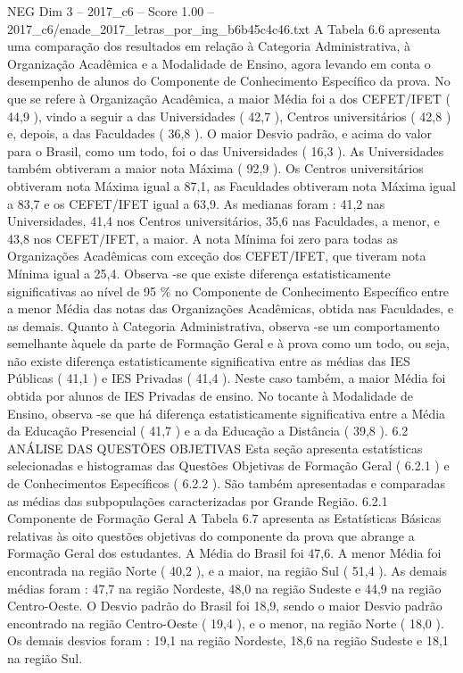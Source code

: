 \begin{textsample}{NEG Dim 3 – 2017\_c6 – Score 1.00 – 2017\_c6/enade\_2017\_letras\_por\_ing\_b6b45c4c46.txt}
A Tabela 6.6 apresenta uma comparação dos resultados em relação à Categoria Administrativa, à Organização Acadêmica e a Modalidade de Ensino, agora levando em conta o desempenho de alunos do Componente de Conhecimento Específico da prova.
No que se refere à Organização Acadêmica, a maior Média foi a dos CEFET/IFET ( 44,9 ), vindo a seguir a das Universidades ( 42,7 ), Centros universitários ( 42,8 ) e, depois, a das Faculdades ( 36,8 ).
O maior Desvio padrão, e acima do valor para o Brasil, como um todo, foi o das Universidades ( 16,3 ).
As Universidades também obtiveram a maior nota Máxima ( 92,9 ).
Os Centros universitários obtiveram nota Máxima igual a 87,1, as Faculdades obtiveram nota Máxima igual a 83,7 e os CEFET/IFET igual a 63,9.
As medianas foram : 41,2 nas Universidades, 41,4 nos Centros universitários, 35,6 nas Faculdades, a menor, e 43,8 nos CEFET/IFET, a maior.
A nota Mínima foi zero para todas as Organizações Acadêmicas com exceção dos CEFET/IFET, que tiveram nota Mínima igual a 25,4.
Observa -se que existe diferença estatisticamente significativas ao nível de 95 \% no Componente de Conhecimento Específico entre a menor Média das notas das Organizações Acadêmicas, obtida nas Faculdades, e as demais.
Quanto à Categoria Administrativa, observa -se um comportamento semelhante àquele da parte de Formação Geral e à prova como um todo, ou seja, não existe diferença estatisticamente significativa entre as médias das IES Públicas ( 41,1 ) e IES Privadas ( 41,4 ).
Neste caso também, a maior Média foi obtida por alunos de IES Privadas de ensino.
No tocante à Modalidade de Ensino, observa -se que há diferença estatisticamente significativa entre a Média da Educação Presencial ( 41,7 ) e a da Educação a Distância ( 39,8 ). 6.2 ANÁLISE DAS QUESTÕES OBJETIVAS Esta seção apresenta estatísticas selecionadas e histogramas das Questões Objetivas de Formação Geral ( 6.2.1 ) e de Conhecimentos Específicos ( 6.2.2 ).
São também apresentadas e comparadas as médias das subpopulações caracterizadas por Grande Região. 6.2.1 Componente de Formação Geral A Tabela 6.7 apresenta as Estatísticas Básicas relativas às oito questões objetivas do componente da prova que abrange a Formação Geral dos estudantes.
A Média do Brasil foi 47,6.
A menor Média foi encontrada na região Norte ( 40,2 ), e a maior, na região Sul ( 51,4 ).
As demais médias foram : 47,7 na região Nordeste, 48,0 na região Sudeste e 44,9 na região Centro-Oeste.
O Desvio padrão do Brasil foi 18,9, sendo o maior Desvio padrão encontrado na região Centro-Oeste ( 19,4 ), e o menor, na região Norte ( 18,0 ).
Os demais desvios foram : 19,1 na região Nordeste, 18,6 na região Sudeste e 18,1 na região Sul.

\end{textsample}

